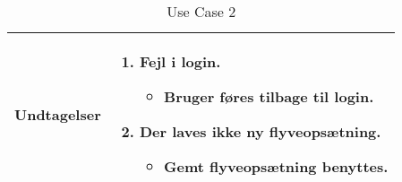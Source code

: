 \begin{table}[H]
\begin{tabular}{| p{3cm}| p{11.5cm}|}
Undtagelser							& 

									\renewcommand{\labelenumi}{\Roman{enumi}:}
									\renewcommand{\labelenumii}{\alph{enumii})}
									\begin{enumerate}[a:,topsep=0.0cm,leftmargin=0.5cm]
										\item Fejl i login.
											\begin{itemize}[topsep=0cm, leftmargin=1cm]
												\item Bruger føres tilbage til login.
											\end{itemize}
										\vspace{0.4cm}
										\item Der laves ikke ny flyveopsætning.
											\begin{itemize}[topsep=0cm, leftmargin=1cm]
												\item Gemt flyveopsætning benyttes.
											\end{itemize}
									\end{enumerate} \\\hline
										

\end{tabular}
\caption{Use Case 2}
\label{tab:UC2}
\end{table}